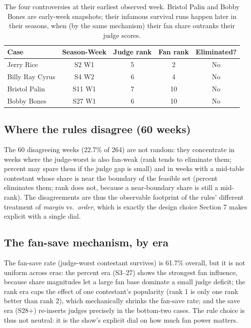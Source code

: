 \documentclass[12pt]{article}
\begin{document}
\begin{table}[h]
\centering
\begin{tabular}{lcccc}
\toprule
Case & Season-Week & Judge rank & Fan rank & Eliminated? \\
\midrule
Jerry Rice & S2 W1 & 5 & 2 & No \\
Billy Ray Cyrus & S4 W2 & 6 & 4 & No \\
Bristol Palin & S11 W1 & 7 & 10 & No \\
Bobby Bones & S27 W1 & 6 & 10 & No \\
\bottomrule
\end{tabular}
\caption{The four controversies at their earliest observed week. Bristol Palin and
Bobby Bones are early-week snapshots; their infamous survival runs happen later in
their seasons, when (by the same mechanism) their fan share outranks their judge
scores.}
\label{tab:cases}
\end{table}

\subsection*{Where the rules disagree (60 weeks)}
The 60 disagreeing weeks (22.7\% of 264) are not random: they concentrate in weeks
where the judge-worst is also fan-weak (rank tends to eliminate them; percent may
spare them if the judge gap is small) and in weeks with a mid-table contestant whose
share is near the boundary of the feasible set (percent eliminates them; rank does
not, because a near-boundary share is still a mid-rank). The disagreements are thus
the observable footprint of the rules' different treatment of \emph{margin} vs.\ 
\emph{order}, which is exactly the design choice Section 7 makes explicit with a
single dial.

\subsection*{The fan-save mechanism, by era}
The fan-save rate (judge-worst contestant survives) is 61.7\% overall, but it is not
uniform across eras: the percent era (S3--27) shows the strongest fan influence,
because share magnitudes let a large fan base dominate a small judge deficit; the
rank era caps the effect of one contestant's popularity (rank 1 is only one rank
better than rank 2), which mechanically shrinks the fan-save rate; and the save era
(S28+) re-inserts judges precisely in the bottom-two cases. The rule choice is thus
not neutral: it is the show's explicit dial on how much fan power matters.
\end{document}
